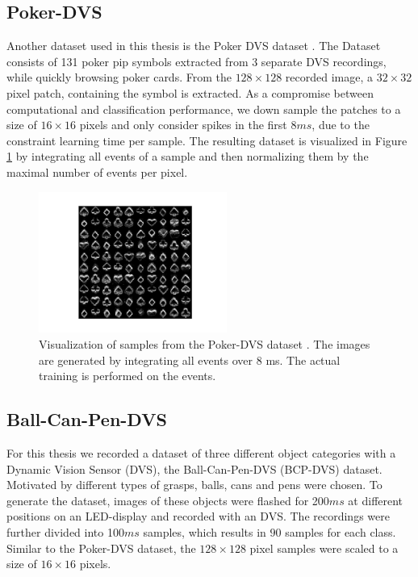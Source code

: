 \subsection{Poker-DVS} \label{c:pokerdvs}

Another dataset used in this thesis is the Poker DVS dataset \cite{serrano2013128}.
The Dataset consists of 131 poker pip symbols extracted from 3 separate DVS recordings, while quickly browsing poker cards.
From the $128 \times 128$ recorded image, a $32 \times 32$ pixel patch, containing the symbol is extracted.
As a compromise between computational and classification performance, we down sample the patches to a size of $16 \times 16$ pixels and only consider spikes in the first $8 ms$, due to the constraint learning time per sample.
The resulting dataset is visualized in Figure \ref{fig:pokerdvs} by integrating all events of a sample and then normalizing them by the maximal number of events per pixel.
 
    
\begin{figure}[h!]
	\centering
    	\includegraphics[width=0.55\textwidth]{imgs/poker_ds.png} 
    \caption[Samples from the Poker-DVS dataset.]{Visualization of samples from the Poker-DVS dataset \cite{serrano2013128}. The images are generated by integrating all events over $8$ ms. The actual training is performed on the events.}
	\label{fig:pokerdvs}
\end{figure}


\subsection{Ball-Can-Pen-DVS} \label{c:bcpdvs}

For this thesis we recorded a dataset of three different object categories with a Dynamic Vision Sensor (DVS), the Ball-Can-Pen-DVS (BCP-DVS) dataset.
Motivated by different types of grasps, balls, cans and pens were chosen.   
To generate the dataset, images of these objects were flashed for 200$ms$ at different positions on an LED-display and recorded with an DVS.
The recordings were further divided into 100$ms$ samples, which results in $90$ samples for each class. 
Similar to the Poker-DVS dataset, the $128 \times 128$ pixel samples were scaled to a size of $16 \times 16$ pixels. 

